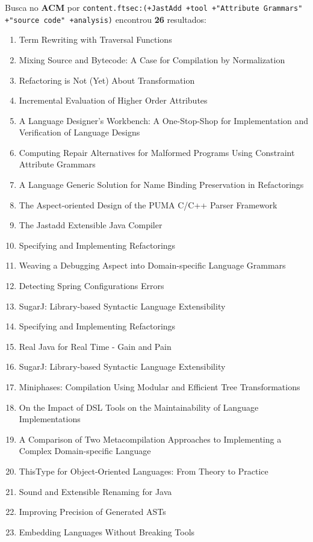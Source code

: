 Busca no {\bf ACM} por
\texttt{content.ftsec:(+JastAdd +tool +"Attribute Grammars" +"source code" +analysis)}
encontrou {\bf 26}
resultados:

\begin{enumerate}
\item Term Rewriting with Traversal Functions
\item Mixing Source and Bytecode: A Case for Compilation by Normalization
\item Refactoring is Not (Yet) About Transformation
\item Incremental Evaluation of Higher Order Attributes
\item A Language Designer's Workbench: A One-Stop-Shop for Implementation and Verification of Language Designs
\item Computing Repair Alternatives for Malformed Programs Using Constraint Attribute Grammars
\item A Language Generic Solution for Name Binding Preservation in Refactorings
\item The Aspect-oriented Design of the PUMA C/C++ Parser Framework
\item The Jastadd Extensible Java Compiler
\item Specifying and Implementing Refactorings
\item Weaving a Debugging Aspect into Domain-specific Language Grammars
\item Detecting Spring Configurations Errors
\item SugarJ: Library-based Syntactic Language Extensibility
\item Specifying and Implementing Refactorings
\item Real Java for Real Time - Gain and Pain
\item SugarJ: Library-based Syntactic Language Extensibility
\item Miniphases: Compilation Using Modular and Efficient Tree Transformations
\item On the Impact of DSL Tools on the Maintainability of Language Implementations
\item A Comparison of Two Metacompilation Approaches to Implementing a Complex Domain-specific Language
\item ThisType for Object-Oriented Languages: From Theory to Practice
\item Sound and Extensible Renaming for Java
\item Improving Precision of Generated ASTs
\item Embedding Languages Without Breaking Tools

\end{enumerate}
